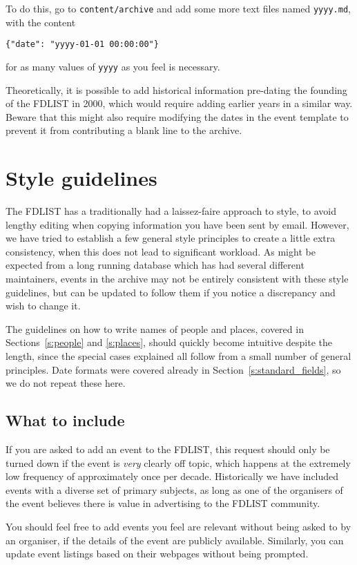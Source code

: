 \documentclass[12pt]{scrartcl}
\theoremstyle{definition}
\begin{document}
To do this, go to \verb|content/archive| and add some more text files named \verb|yyyy.md|, with the content
\begin{center}
\verb|{"date": "yyyy-01-01 00:00:00"}|
\end{center}
for as many values of \verb|yyyy| as you feel is necessary.

Theoretically, it is possible to add historical information pre-dating the founding of the FDLIST in 2000, which would require adding earlier years in a similar way.
Beware that this might also require modifying the dates in the event template to prevent it from contributing a blank line to the archive.

\section{Style guidelines}
\label{s:style}
The FDLIST has a traditionally had a laissez-faire approach to style, to avoid lengthy editing when copying information you have been sent by email.
However, we have tried to establish a few general style principles to create a little extra consistency, when this does not lead to significant workload.
As might be expected from a long running database which has had several different maintainers, events in the archive may not be entirely consistent with these style guidelines, but can be updated to follow them if you notice a discrepancy and wish to change it.

The guidelines on how to write names of people and places, covered in Sections~\ref{s:people} and \ref{s:places}, should quickly become intuitive despite the length, since the special cases explained all follow from a small number of general principles.
Date formats were covered already in Section~\ref{s:standard_fields}, so we do not repeat these here.

\subsection{What to include}
If you are asked to add an event to the FDLIST, this request should only be turned down if the event is \emph{very} clearly off topic, which happens at the extremely low frequency of approximately once per decade.
Historically we have included events with a diverse set of primary subjects, as long as one of the organisers of the event believes there is value in advertising to the FDLIST community.

You should feel free to add events you feel are relevant without being asked to by an organiser, if the details of the event are publicly available. Similarly, you can update event listings based on their webpages without being prompted.
\end{document}
